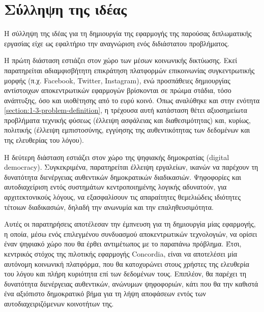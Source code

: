\section{Σύλληψη της ιδέας} \label{section:3-1-idea-conception}

Η σύλληψη της ιδέας για τη δημιουργία της εφαρμογής της παρούσας διπλωματικής εργασίας είχε ως εφαλτήριο την αναγνώριση ενός διδιάστατου προβλήματος.

Η πρώτη διάσταση εστιάζει στον χώρο των μέσων κοινωνικής δικτύωσης. Εκεί παρατηρείται αδιαμφισβήτητη επικράτηση πλατφορμών επικοινωνίας συγκεντρωτικής μορφής (π.χ. Facebook, Twitter, Instagram), ενώ προσπάθειες δημιουργίας αντίστοιχων αποκεντρωτικών εφαρμογών βρίσκονται σε πρώιμα στάδια, τόσο ανάπτυξης, όσο και υιοθέτησης από το ευρύ κοινό. Όπως αναλύθηκε και στην ενότητα \ref{section:1-3-problem-definition}, η τρέχουσα αυτή κατάσταση θέτει αξιοσημείωτα προβλήματα τεχνικής φύσεως (έλλειψη ασφάλειας και διαθεσιμότητας) και, κυρίως, πολιτικής (έλλειψη εμπιστοσύνης, εγγύησης της αυθεντικότητας των δεδομένων και της ελευθερίας του λόγου).

Η δεύτερη διάσταση εστιάζει στον χώρο της ψηφιακής δημοκρατίας (digital democracy). Συγκεκριμένα, παρατηρείται έλλειψη  εργαλείων, ικανών να παρέχουν τη δυνατότητα διενέργειας αυθεντικών δημοκρατικών διαδικασιών. Ψηφοφορίες και αυτοδιαχείριση εντός συστημάτων κεντροποιημένης λογικής αδυνατούν, για αρχιτεκτονικούς λόγους, να εξασφαλίσουν τις απαραίτητες θεμελιώδεις ιδιότητες τέτοιων διαδικασιών, δηλαδή την ανωνυμία και την επαληθευσιμότητα.

Αυτές οι παρατηρήσεις αποτέλεσαν την έμπνευση για τη δημιουργία μίας εφαρμογής, η οποία, μέσω ενός επιλεγμένου συνδυασμού αποκεντρωτικών τεχνολογιών, να ορίσει έναν ψηφιακό χώρο που θα έρθει αντιμέτωπος με το παραπάνω πρόβλημα. Έτσι, κεντρικός στόχος της πιλοτικής εφαρμογής Concordia, είναι να αποτελέσει μία αυτόνομη κοινωνική πλατφόρμα, που θα κατοχυρώνει στους χρήστες της ελευθερία του λόγου και πλήρη κυριότητα επί των δεδομένων τους. Επιπλέον, θα παρέχει τη δυνατότητα διενέργειας αυθεντικών, ανώνυμων ψηφοφοριών, κάτι που θα την καθιστά ένα αξιόπιστο δημοκρατικό βήμα για τη λήψη αποφάσεων εντός των αυτοδιαχειριζόμενων κοινοτήτων της.
